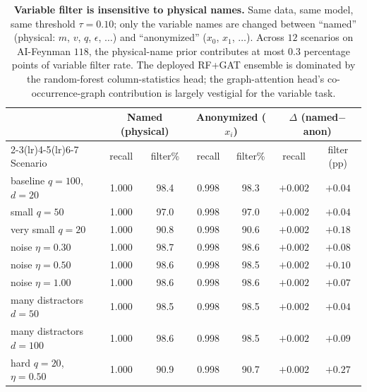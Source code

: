 \documentclass[11pt]{article}
\begin{document}
\begin{table}[h!]\centering
\caption{\textbf{Variable filter is insensitive to physical names.} Same data,
same model, same threshold $\tau=0.10$; only the variable names are changed
between ``named'' (physical: $m$, $v$, $q$, $\epsilon$, $\dots$) and
``anonymized'' ($x_0$, $x_1$, $\dots$). Across $12$ scenarios on AI-Feynman
$118$, the physical-name prior contributes at most $0.3$ percentage points of
variable filter rate. The deployed RF+GAT ensemble is dominated by the
random-forest column-statistics head; the graph-attention head's
co-occurrence-graph contribution is largely vestigial for the variable task.}
\label{tab:name-ablation-vars}
\footnotesize
\begin{tabular}{lcccccc}
\toprule
                              & \multicolumn{2}{c}{Named (physical)} & \multicolumn{2}{c}{Anonymized ($x_i$)} & \multicolumn{2}{c}{$\Delta$ (named$-$anon)} \\
\cmidrule(lr){2-3}\cmidrule(lr){4-5}\cmidrule(lr){6-7}
Scenario                      & recall & filter\% & recall & filter\% & recall & filter (pp) \\
\midrule
baseline $q{=}100$, $d{=}20$ & 1.000 & 98.4 & 0.998 & 98.3 & $+0.002$ & $+0.04$ \\
small $q{=}50$               & 1.000 & 97.0 & 0.998 & 97.0 & $+0.002$ & $+0.04$ \\
very small $q{=}20$          & 1.000 & 90.8 & 0.998 & 90.6 & $+0.002$ & $+0.18$ \\
noise $\eta=0.30$            & 1.000 & 98.7 & 0.998 & 98.6 & $+0.002$ & $+0.08$ \\
noise $\eta=0.50$            & 1.000 & 98.6 & 0.998 & 98.5 & $+0.002$ & $+0.10$ \\
noise $\eta=1.00$            & 1.000 & 98.6 & 0.998 & 98.6 & $+0.002$ & $+0.07$ \\
many distractors $d{=}50$    & 1.000 & 98.5 & 0.998 & 98.5 & $+0.002$ & $+0.04$ \\
many distractors $d{=}100$   & 1.000 & 98.6 & 0.998 & 98.5 & $+0.002$ & $+0.09$ \\
hard $q{=}20$, $\eta=0.50$   & 1.000 & 90.9 & 0.998 & 90.7 & $+0.002$ & $+0.27$ \\
\bottomrule
\end{tabular}
\end{table}
\end{document}
